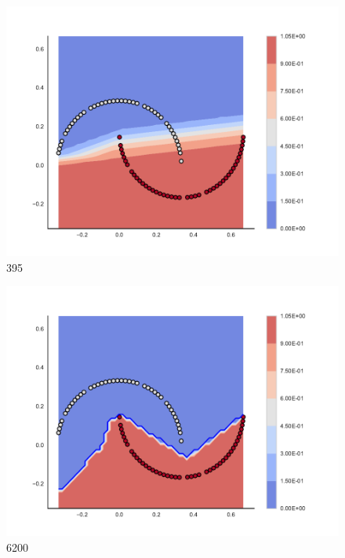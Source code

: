 \begin{subfigure}[b]{0.09\textwidth}
    \includegraphics[clip, trim=2.35cm 1.75cm 4.5cm 0cm,width=\textwidth]{img/convergence/395.pdf}
    \caption{395}
    \label{fig:convergence_395}
\end{subfigure}
%
\begin{subfigure}[b]{0.09\textwidth}
    \includegraphics[clip, trim=2.35cm 1.75cm 4.5cm 0cm,width=\textwidth]{img/convergence/6200.pdf}
    \caption{6200}
    \label{fig:convergence_6200}
\end{subfigure}
%

